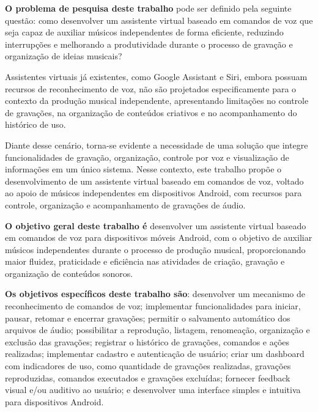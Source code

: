 \documentclass[12pt,oneside,a4paper,brazil,final]{abntex2}
\begin{document}
\textbf{O problema de pesquisa deste trabalho} pode ser definido pela seguinte questão: como desenvolver um assistente virtual baseado em comandos de voz que seja capaz de auxiliar músicos independentes de forma eficiente, reduzindo interrupções e melhorando a produtividade durante o processo de gravação e organização de ideias musicais?



Assistentes virtuais já existentes, como Google Assistant e Siri, embora possuam recursos de reconhecimento de voz, não são projetados especificamente para o contexto da produção musical independente, apresentando limitações no controle de gravações, na organização de conteúdos criativos e no acompanhamento do histórico de uso.



Diante desse cenário, torna-se evidente a necessidade de uma solução que integre funcionalidades de gravação, organização, controle por voz e visualização de informações em um único sistema. Nesse contexto, este trabalho propõe o desenvolvimento de um assistente virtual baseado em comandos de voz, voltado ao apoio de músicos independentes em dispositivos Android, com recursos para controle, organização e acompanhamento de gravações de áudio.



\textbf{O objetivo geral deste trabalho é} desenvolver um assistente virtual baseado em comandos de voz para dispositivos móveis Android, com o objetivo de auxiliar músicos independentes durante o processo de produção musical, proporcionando maior fluidez, praticidade e eficiência nas atividades de criação, gravação e organização de conteúdos sonoros.



\textbf{Os objetivos específicos deste trabalho são}: desenvolver um mecanismo de reconhecimento de comandos de voz; implementar funcionalidades para iniciar, pausar, retomar e encerrar gravações; permitir o salvamento automático dos arquivos de áudio; possibilitar a reprodução, listagem, renomeação, organização e exclusão das gravações; registrar o histórico de gravações, comandos e ações realizadas; implementar cadastro e autenticação de usuário; criar um dashboard com indicadores de uso, como quantidade de gravações realizadas, gravações reproduzidas, comandos executados e gravações excluídas; fornecer feedback visual e/ou auditivo ao usuário; e desenvolver uma interface simples e intuitiva para dispositivos Android.
\end{document}
